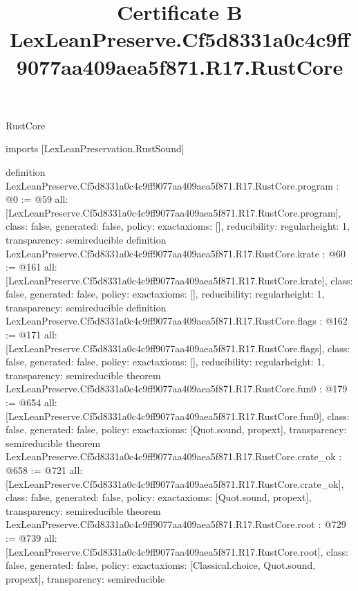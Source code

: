 \begin{lexlean}{RustCore}
\title{Certificate B LexLeanPreserve.Cf5d8331a0c4c9ff9077aa409aea5f871.R17.RustCore}
\begin{coremodule}
imports [LexLeanPreservation.RustSound]

definition LexLeanPreserve.Cf5d8331a0c4c9ff9077aa409aea5f871.R17.RustCore.program : @0 := @59 {
  all: [LexLeanPreserve.Cf5d8331a0c4c9ff9077aa409aea5f871.R17.RustCore.program],
  class: false,
  generated: false,
  policy: exact{axioms: []},
  reducibility: regular{height: 1},
  transparency: semireducible
}
definition LexLeanPreserve.Cf5d8331a0c4c9ff9077aa409aea5f871.R17.RustCore.krate : @60 := @161 {
  all: [LexLeanPreserve.Cf5d8331a0c4c9ff9077aa409aea5f871.R17.RustCore.krate],
  class: false,
  generated: false,
  policy: exact{axioms: []},
  reducibility: regular{height: 1},
  transparency: semireducible
}
definition LexLeanPreserve.Cf5d8331a0c4c9ff9077aa409aea5f871.R17.RustCore.flags : @162 := @171 {
  all: [LexLeanPreserve.Cf5d8331a0c4c9ff9077aa409aea5f871.R17.RustCore.flags],
  class: false,
  generated: false,
  policy: exact{axioms: []},
  reducibility: regular{height: 1},
  transparency: semireducible
}
theorem LexLeanPreserve.Cf5d8331a0c4c9ff9077aa409aea5f871.R17.RustCore.fun0 : @179 := @654 {
  all: [LexLeanPreserve.Cf5d8331a0c4c9ff9077aa409aea5f871.R17.RustCore.fun0],
  class: false,
  generated: false,
  policy: exact{axioms: [Quot.sound, propext]},
  transparency: semireducible
}
theorem LexLeanPreserve.Cf5d8331a0c4c9ff9077aa409aea5f871.R17.RustCore.crate_ok : @658 := @721 {
  all: [LexLeanPreserve.Cf5d8331a0c4c9ff9077aa409aea5f871.R17.RustCore.crate_ok],
  class: false,
  generated: false,
  policy: exact{axioms: [Quot.sound, propext]},
  transparency: semireducible
}
theorem LexLeanPreserve.Cf5d8331a0c4c9ff9077aa409aea5f871.R17.RustCore.root : @729 := @739 {
  all: [LexLeanPreserve.Cf5d8331a0c4c9ff9077aa409aea5f871.R17.RustCore.root],
  class: false,
  generated: false,
  policy: exact{axioms: [Classical.choice, Quot.sound, propext]},
  transparency: semireducible
}


\end{coremodule}
\end{lexlean}
